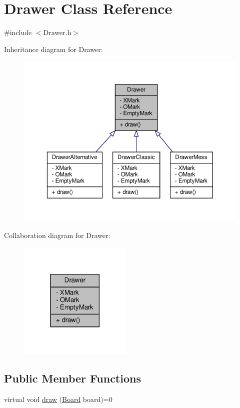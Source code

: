 \hypertarget{classDrawer}{}\section{Drawer Class Reference}
\label{classDrawer}


{\ttfamily \#include $<$Drawer.\+h$>$}



Inheritance diagram for Drawer\+:
\nopagebreak
\begin{figure}[H]
\begin{center}
\leavevmode
\includegraphics[width=350pt]{classDrawer__inherit__graph}
\end{center}
\end{figure}


Collaboration diagram for Drawer\+:
\nopagebreak
\begin{figure}[H]
\begin{center}
\leavevmode
\includegraphics[width=153pt]{classDrawer__coll__graph}
\end{center}
\end{figure}
\subsection*{Public Member Functions}
\begin{DoxyCompactItemize}
\item 
virtual void \hyperlink{classDrawer_afe75fce45596f02f01514322ebd57c8c}{draw} (\hyperlink{classBoard}{Board} board)=0
\end{DoxyCompactItemize}
